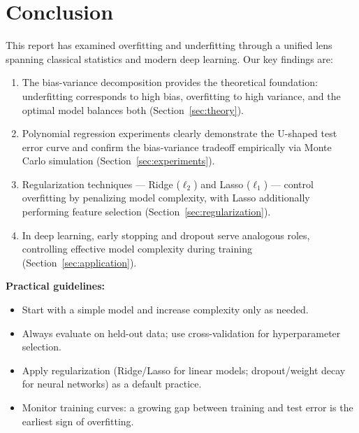 \documentclass[12pt, a4paper]{article}
\begin{document}
\section{Conclusion}
\label{sec:conclusion}

This report has examined overfitting and underfitting through a unified lens spanning
classical statistics and modern deep learning. Our key findings are:

\begin{enumerate}
    \item The bias-variance decomposition provides the theoretical foundation: underfitting
          corresponds to high bias, overfitting to high variance, and the optimal model
          balances both (Section~\ref{sec:theory}).
    \item Polynomial regression experiments clearly demonstrate the U-shaped test error
          curve and confirm the bias-variance tradeoff empirically via Monte Carlo
          simulation (Section~\ref{sec:experiments}).
    \item Regularization techniques --- Ridge ($\ell_2$) and Lasso ($\ell_1$) --- control
          overfitting by penalizing model complexity, with Lasso additionally performing
          feature selection (Section~\ref{sec:regularization}).
    \item In deep learning, early stopping and dropout serve analogous roles, controlling
          effective model complexity during training (Section~\ref{sec:application}).
\end{enumerate}

\textbf{Practical guidelines:}
\begin{itemize}
    \item Start with a simple model and increase complexity only as needed.
    \item Always evaluate on held-out data; use cross-validation for hyperparameter selection.
    \item Apply regularization (Ridge/Lasso for linear models; dropout/weight decay for
          neural networks) as a default practice.
    \item Monitor training curves: a growing gap between training and test error is the
          earliest sign of overfitting.
\end{itemize}



\end{document}
